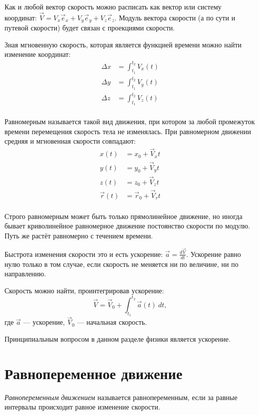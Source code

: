 \documentclass[10pt]{extbook}
\begin{document}
Как и любой вектор скорость можно расписать как вектор или систему координат:
\( \vec{V} = V_x \vec{e}_x + V_y \vec{e}_y + V_z \vec{e}_z \). Модуль вектора
скорости (а по сути и путевой скорости) будет связан с проекциями скорости.

Зная мгновенную скорость, которая является функцией времени можно найти
изменение координат:
\begin{align*}
	\Delta x & = \int_{t_1}^{t_2} V_x(t) \\
	\Delta y & = \int_{t_1}^{t_2} V_y(t) \\
	\Delta z & = \int_{t_1}^{t_2} V_z(t) \\
\end{align*}

Равномерным называется такой вид движения, при котором за любой промежуток
времени перемещения скорость тела не изменялась. При равномерном движении
средняя и мгновенная скорости совпадают:
\begin{align*}
	x(t)       & = x_0 + \vec{V}_x t       \\
	y(t)       & = y_0 + \vec{V}_y t       \\
	z(t)       & = z_0 + \vec{V}_z t       \\
	\vec{r}(t) & = \vec{r}_0 + \vec{V}_r t \\
\end{align*}

Строго равномерным может быть только прямолинейное движение, но иногда бывает
криволинейное равномерное движение постоянство скорости по модулю. Путь же
растёт равномерно с течением времени.

Быстрота изменения скорости это и есть ускорение: \( \vec{a} = \frac{d
	\vec{V}}{d t} \). Ускорение равно нулю только в том случае, если скорость не
меняется ни по величине, ни по направлению.

Скорость можно найти, проинтегрировав ускорение:
\[
	\vec{V} = \vec{V}_0 + \int_{{t_1}}^{{t_2}} {\vec{a}(t)} \: d{t} {}
	,\] где \( \vec{a} \) --- ускорение, \( \vec{V}_0 \) --- начальная скорость.

Принципиальным вопросом в данном разделе  физики является ускорение.

\section{Равнопеременное движение}

\emph{Равнопеременным движением} называется равнопеременным, если за равные
интервалы происходит равное изменение скорости.
\end{document}

